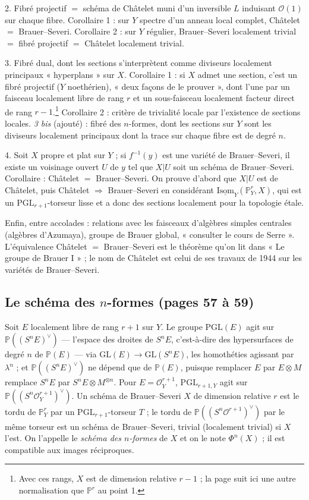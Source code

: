 \documentclass[11pt,a4paper]{article}
\begin{document}
2. Fibré projectif $=$ schéma de Châtelet muni d'un inversible $L$ induisant
$\mathcal{O}(1)$ sur chaque fibre. Corollaire 1 : sur $Y$ spectre d'un anneau
local complet, Châtelet $=$ Brauer–Severi. Corollaire 2 : sur $Y$ régulier,
Brauer–Severi localement trivial $=$ fibré projectif $=$ Châtelet localement
trivial.

3. Fibré dual, dont les sections s'interprètent comme diviseurs localement
principaux « hyperplans » sur $X$. Corollaire 1 : si $X$ admet une section,
c'est un fibré projectif ($Y$ noethérien), « deux façons de le prouver », dont
l'une par un faisceau localement libre de rang $r$ et un sous-faisceau
localement facteur direct de rang $r-1$.\footnote{Avec ces rangs, $X$ est
de dimension relative $r-1$ ; la page suit ici une autre normalisation que
$\mathbb{P}^{r}$ au point 1.} Corollaire 2 : critère de trivialité locale par
l'existence de sections locales. \emph{3 bis} (ajouté) : fibré des $n$-formes,
dont les sections sur $Y$ sont les diviseurs localement principaux dont la
trace sur chaque fibre est de degré $n$.

4. Soit $X$ propre et plat sur $Y$ ; si $f^{-1}(y)$ est une variété de
Brauer–Severi, il existe un voisinage ouvert $U$ de $y$ tel que $X|U$ soit un
schéma de Brauer–Severi. Corollaire : Châtelet $=$ Brauer–Severi. On prouve
d'abord que $X|U$ est de Châtelet, puis Châtelet $\Rightarrow$ Brauer–Severi en
considérant $\underline{\mathrm{Isom}}_Y(\mathbb{P}^{r}_Y, X)$, qui est un
$\mathrm{PGL}_{r+1}$-torseur lisse et a donc des sections localement pour la
topologie étale.

Enfin, entre accolades : relations avec les faisceaux d'algèbres simples
centrales (algèbres d'Azumaya), groupe de Brauer global, « consulter le cours
de Serre ». L'équivalence Châtelet $=$ Brauer–Severi est le théorème qu'on lit
dans « Le groupe de Brauer I » ; le nom de Châtelet est celui de ses travaux de
1944 sur les variétés de Brauer–Severi.

\subsection*{Le schéma des $n$-formes (pages 57 à 59)}

Soit $E$ localement libre de rang $r+1$ sur $Y$. Le groupe $\mathrm{PGL}(E)$
agit sur $\mathbb{P}((S^{n}E)^{\vee})$ — l'espace des droites de $S^{n}E$,
c'est-à-dire des hypersurfaces de degré $n$ de $\mathbb{P}(E)$ — via
$\mathrm{GL}(E) \to \mathrm{GL}(S^{n}E)$, les homothéties agissant par
$\lambda^{n}$ ; et $\mathbb{P}((S^{n}E)^{\vee})$ ne dépend que de
$\mathbb{P}(E)$, puisque remplacer $E$ par $E \otimes M$ remplace $S^{n}E$ par
$S^{n}E \otimes M^{\otimes n}$. Pour $E = \mathcal{O}_Y^{r+1}$,
$\mathrm{PGL}_{r+1,Y}$ agit sur $\mathbb{P}((S^{n}\mathcal{O}_Y^{r+1})^{\vee})$.
Un schéma de Brauer–Severi $X$ de dimension relative $r$ est le tordu de
$\mathbb{P}^{r}_Y$ par un $\mathrm{PGL}_{r+1}$-torseur $T$ ; le tordu de
$\mathbb{P}((S^{n}\mathcal{O}^{r+1})^{\vee})$ par le même torseur est un schéma
de Brauer–Severi, trivial (localement trivial) si $X$ l'est. On l'appelle le
\emph{schéma des $n$-formes} de $X$ et on le note $\Phi^{n}(X)$ ; il est
compatible aux images réciproques.
\end{document}
